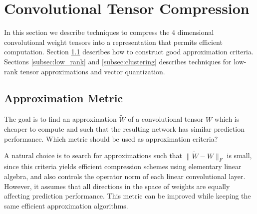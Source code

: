 
\section{Convolutional Tensor Compression}\label{sec:approx_tech}
In this section we describe
techniques to compress the
4 dimensional convolutional weight tensors into a representation that permits
efficient computation. 
Section \ref{reconstr_sect} describes how to construct good approximation 
criteria. Sections \ref{subsec:low_rank} and \ref{subsec:clustering} 
describes techniques for low-rank tensor
approximations and vector quantization. 





\subsection{Approximation Metric}
\label{reconstr_sect}

The goal is to find an approximation $\widetilde{W}$ of a convolutional tensor $W$ 
which is cheaper to compute and such that the resulting network
has similar prediction performance. Which metric should be used
as approximation criteria?

A natural choice is to search for approximations such that 
$\| \widetilde{W} - W \|_F$ is small, since this criteria yields 
efficient compression schemes using elementary linear algebra, and also controls
the operator norm of each linear convolutional layer.
%
However, it assumes that all directions in the space of weights are equally 
affecting prediction performance. This metric can be improved while 
keeping the same efficient approximation algorithms.

